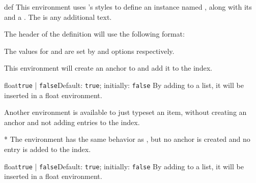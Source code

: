 \documentclass[11pt, outdir = ./out]{article}
\begin{document}
\begin{Environmentenv}{def}{}{}
    \label{environmentdef}
    This environment uses 's styles to define an instance named , along with its  and a . The  is any additional text.

    The header of the definition will use the following format:


    The values for  and  are set by  and  options respectively.

    This environment will create an anchor to  and add it to the index.
\end{Environmentenv}


\begin{DocsExample}
    \begin{EnumItemOptiondef}{float}{\texttt{true} | \texttt{false}}{Default: \texttt{true}; initially: \texttt{false}}
        By adding  to a list, it will be inserted in a float environment.
    \end{EnumItemOptiondef}
\end{DocsExample}

Another environment is available to just typeset an item, without creating an anchor and not adding entries to the index.

\begin{Environmentenv}{*}{}{}
    The  environment has the same behavior as , but no anchor is created and no entry is added to the index.
\end{Environmentenv}

\begin{DocsExample}
    \begin{EnumItemOption*}{float}{\texttt{true} | \texttt{false}}{Default: \texttt{true}; initially: \texttt{false}}
        By adding  to a list, it will be inserted in a float environment.
    \end{EnumItemOption*}
\end{DocsExample}
\end{document}
